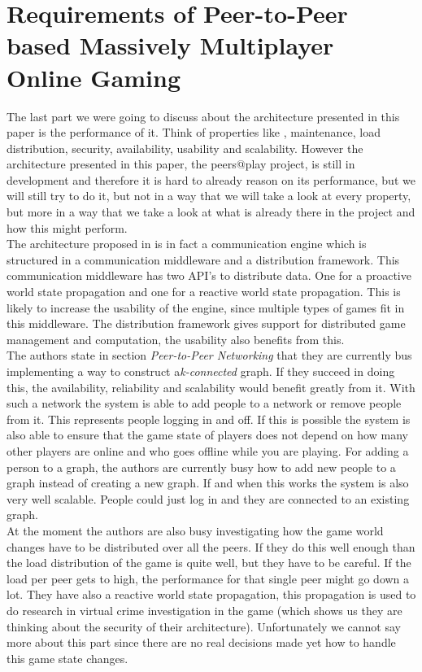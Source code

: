 \section*{Requirements of Peer-to-Peer based Massively Multiplayer Online Gaming}

The last part we were going to discuss about the architecture presented in this paper is the performance of it. Think of properties like , maintenance, load distribution, security, availability, usability and scalability. However the architecture presented in this paper, the peers@play project, is still in development and therefore it is hard to already reason on its performance, but we will still try to do it, but not in a way that we will take a look at every property, but more in a way that we take a look at what is already there in the project and how this might perform.\\
\indent The architecture proposed in \cite{peer} is in fact a communication engine which is structured in a communication middleware and a distribution framework. This communication middleware has two API's to distribute data. One for a proactive world state propagation and one for a reactive world state propagation. This is likely to increase the usability of the engine, since multiple types of games fit in this middleware. The distribution framework gives support for distributed game management and computation, the usability also benefits from this.\\
\indent The authors state in section \emph{Peer-to-Peer Networking} that they are currently bus implementing a way to construct a\emph{k-connected} graph. If they succeed in doing this, the availability, reliability and scalability would benefit greatly from it. With such a network the system is able to add people to a network or remove people from it. This represents people logging in and off. If this is possible the system is also able to ensure that the game state of players does not depend on how many other players are online and who goes offline while you are playing. For adding a person to a graph, the authors are currently busy how to add new people to a graph instead of creating a new graph. If and when this works the system is also very well scalable. People could just log in and they are connected to an existing graph.\\
\indent At the moment the authors are also busy investigating how the game world changes have to be distributed over all the peers. If they do this well enough than the load distribution of the game is quite well, but they have to be careful. If the load per peer gets to high, the performance for that single peer might go down a lot. They have also a reactive world state propagation, this propagation is used to do research in virtual crime investigation in the game (which shows us they are thinking about the security of their architecture). Unfortunately we cannot say more about this part since there are no real decisions made yet how to handle this game state changes.\\
